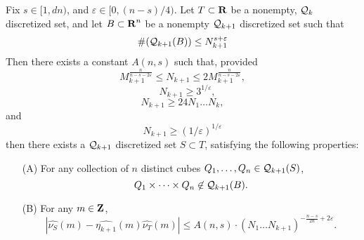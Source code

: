 \begin{lemma} \label{discreteFourierBuildingBlock}
    Fix $s \in [1,dn)$, and $\varepsilon \in [0,(n-s)/4)$. Let $T \subset \operatorname{\mathbf{R}}$ be a nonempty, $\operatorname{\mathcal{Q}}_k$ discretized set, and let $B \subset \operatorname{\mathbf{R}}^n$ be a nonempty $\operatorname{\mathcal{Q}}_{k+1}$ discretized set such that
    \begin{equation} \label{equation982589128942189}
    \begin{split}
        \#(\operatorname{\mathcal{Q}}_{k+1}(B)) \leq N_{k+1}^{s + \varepsilon}
    \end{split}
    \end{equation}
    Then there exists a constant $A(n,s)$ such that, provided
    \begin{equation} \label{equation5523786128439}
        M_{k+1}^{\frac{n}{n - s - 2\varepsilon}} \leq N_{k+1} \leq 2 M_{k+1}^{\frac{n}{n - s - 2\varepsilon}},
    \end{equation}
    \begin{equation} \label{equation189248914891}
        \quad N_{k+1} \geq 3^{1/\varepsilon},
    \end{equation}
    \begin{equation} \label{equation8941894189238912}
        N_{k+1} \geq 24 N_1 \dots N_k,
    \end{equation}
    and
    \begin{equation} \label{equation77871247817841278}
        N_{k+1} \geq (1/\varepsilon)^{1/\varepsilon}
    \end{equation}
    then there exists a $\operatorname{\mathcal{Q}}_{k+1}$ discretized set $S \subset T$, satisfying the following properties:
    \begin{enumerate}
        \item[(A)] For any collection of $n$ distinct cubes $Q_1, \dots, Q_n \in \operatorname{\mathcal{Q}}_{k+1}(S)$,
        \[ Q_1 \times \dots \times Q_n \not \in \operatorname{\mathcal{Q}}_{k+1}(B). \]

        \item[(B)] For any $m \in \operatorname{\mathbf{Z}}$,
        \[ |\widehat{\nu_S}(m) - \widehat{\eta_{k+1}}(m) \widehat{\nu_T}(m)| \leq A(n,s) \cdot (N_1 \dots N_{k+1})^{-\frac{n - s}{2n} + 2\varepsilon}. \]
    \end{enumerate}
\end{lemma}
